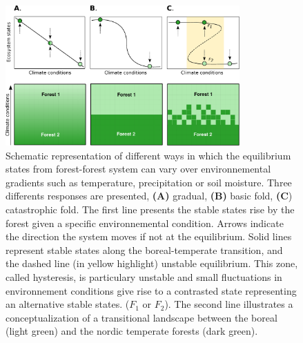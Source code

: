 \begin{figure}[t]
	\begin{center}
	\includegraphics[width=0.8\textwidth]{fig/states.pdf}
	\end{center}
	\caption{Schematic representation of different ways in which the equilibrium
	states from forest-forest system can vary over environnemental gradients such as temperature, precipitation
	or soil moisture. Three differents responses are presented,
	\textbf{(A)} gradual, \textbf{(B)} basic fold, \textbf{(C}) catastrophic fold.
	The first line presents the stable states rise by the forest
	given a specific environnemental condition. Arrows indicate the
	direction the system moves if not at the equilibrium. 
	Solid lines represent stable states along the boreal-temperate
	transition, and the dashed line (in yellow highlight) unstable equilibrium. This zone,
	called hysteresis, is particulary unstable and small fluctuations in
	environnement conditions give rise to a contrasted state representing an
	alternative stable states. ($F_1$ or $F_2$). 
	The second line illustrates a conceptualization of a transitional landscape
	between the boreal (light green) and the nordic temperate forests (dark
	green).}
	\label{fig1}
	\vspace{-1.25em}
\end{figure}


